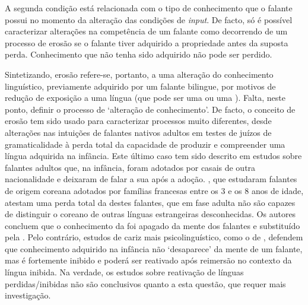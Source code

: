 \documentclass[output=paper]{LSP/langsci}
\begin{document}
A segunda condição está relacionada com o tipo de conhecimento que o falante possui no momento da alteração das condições de \textit{input}. De facto, só é possível caracterizar alterações na competência de um falante como decorrendo de um processo de erosão se o falante tiver adquirido a propriedade antes da suposta perda. Conhecimento que não tenha sido adquirido não pode ser perdido.

Sintetizando, erosão refere-se, portanto, a uma alteração do conhecimento linguístico, previamente adquirido por um falante bilingue, por motivos de redução de exposição a uma língua (que pode ser uma  ou uma ). Falta, neste ponto, definir o processo de `alteração de conhecimento'. De facto, o conceito de erosão tem sido usado para caracterizar processos muito diferentes, desde alterações nas intuições de falantes nativos adultos em testes de juízos de gramaticalidade à perda total da capacidade de produzir e compreender uma língua adquirida na infância. Este último caso tem sido descrito em estudos sobre falantes adultos que, na infância, foram adotados por casais de outra nacionalidade e deixaram de falar a sua  após a adoção. \cite{pallier_etal2003}, que estudaram falantes de origem coreana adotados por famílias francesas entre os 3 e os 8 anos de idade, atestam uma perda total da  destes falantes, que em fase adulta não são capazes de distinguir o coreano de outras línguas estrangeiras desconhecidas. Os autores concluem que o conhecimento da  foi apagado da mente dos falantes e substituído pela . Pelo contrário, estudos de cariz mais psicolinguístico, como o de \cite{paradis2004}, defendem que conhecimento adquirido na infância não `desaparece' da mente de um falante, mas é fortemente inibido e poderá ser reativado após reimersão no contexto da língua inibida. Na verdade, os estudos sobre reativação de línguas perdidas/inibidas não são conclusivos quanto a esta questão, que requer mais investigação. 
\end{document}
